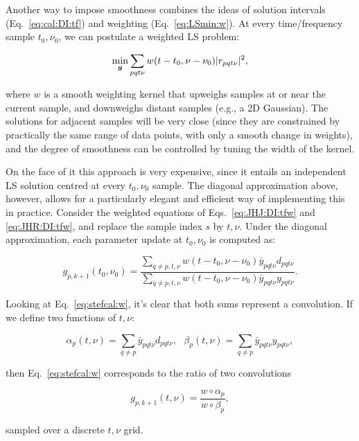 \documentclass[useAMS,usenatbib]{mn2e}
\begin{document}
Another way to impose smoothness combines the ideas of solution intervals  (Eq.~\ref{eq:cal:DI:tf}) 
and weighting (Eq.~\ref{eq:LSmin:w}). At every time/frequency sample $t_0,\nu_0$, we can postulate a weighted 
LS problem:

\begin{equation}
\label{eq:cal:DI:smooth}
\min_{\bmath{g}}\sum_{pqt\nu}w(t-t_0,\nu-\nu_0)|r_{pqt\nu}|^2, 
\end{equation}

where $w$ is a smooth weighting kernel that upweighs samples at or near the current sample, and downweighs distant 
samples (e.g., a 2D Gaussian). The solutions for adjacent samples will be very close (since they 
are constrained by practically the same range of data points, with only a smooth change in weights), and the 
degree of smoothness can be controlled by tuning the width of the kernel.

On the face of it this approach is very expensive, since it entails an independent LS solution centred at 
every $t_0,\nu_0$ sample. The diagonal approximation above, however, allows for a particularly elegant and efficient way of 
implementing this in practice. Consider the weighted equations of Eqs.~\ref{eq:JHJ:DI:tfw} and \ref{eq:JHR:DI:tfw}, 
and replace the sample index $s$ by $t,\nu$. Under the diagonal approximation, each parameter update at $t_0,\nu_0$ is 
computed as:

\begin{equation}
\label{eq:stefcal:w}
g_{p,{k+1}}(t_0,\nu_0) = \frac{\sum\limits_{q\ne p,t,\nu} w(t-t_0,\nu-\nu_0) \bar{y}_{pqt\nu} d_{pqt\nu} }
{\sum\limits_{q\ne p,t,\nu} w(t-t_0,\nu-\nu_0) \bar{y}_{pqt\nu} y_{pqt\nu}}.
\end{equation}

Looking at Eq.~\ref{eq:stefcal:w}, it's clear that both sums represent a convolution. If we define two functions of $t,\nu$:

\[
\alpha_p(t,\nu) = \sum\limits_{q\ne p} \bar{y}_{pqt\nu} d_{pqt\nu},~~~
\beta_p(t,\nu) = \sum\limits_{q\ne p} \bar{y}_{pqt\nu} y_{pqt\nu},
\]

then Eq.~\ref{eq:stefcal:w} corresponds to the ratio of two convolutions

\begin{equation}
\label{eq:JHJ:diag:smooth}
g_{p,k+1}(t,\nu) = \frac{w\circ \alpha_p}{w\circ\beta_p},
\end{equation}

sampled over a discrete $t,\nu$ grid.
\end{document}
